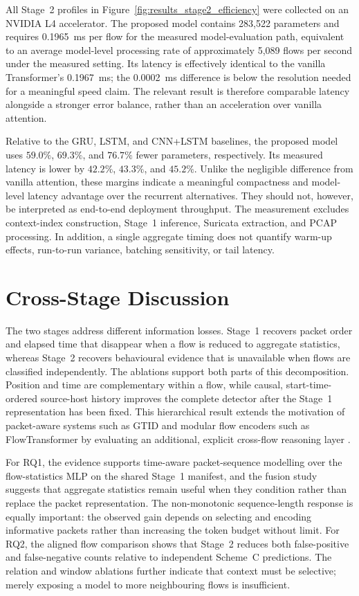 \documentclass[11pt,fleqn]{report}
\begin{document}
All Stage~2 profiles in Figure~\ref{fig:results_stage2_efficiency} were collected on an NVIDIA L4 accelerator. The proposed model contains 283,522 parameters and requires 0.1965~ms per flow for the measured model-evaluation path, equivalent to an average model-level processing rate of approximately 5,089 flows per second under the measured setting. Its latency is effectively identical to the vanilla Transformer's 0.1967~ms; the 0.0002~ms difference is below the resolution needed for a meaningful speed claim. The relevant result is therefore comparable latency alongside a stronger error balance, rather than an acceleration over vanilla attention.

Relative to the GRU, LSTM, and CNN+LSTM baselines, the proposed model uses $59.0\%$, $69.3\%$, and $76.7\%$ fewer parameters, respectively. Its measured latency is lower by $42.2\%$, $43.3\%$, and $45.2\%$. Unlike the negligible difference from vanilla attention, these margins indicate a meaningful compactness and model-level latency advantage over the recurrent alternatives. They should not, however, be interpreted as end-to-end deployment throughput. The measurement excludes context-index construction, Stage~1 inference, Suricata extraction, and PCAP processing. In addition, a single aggregate timing does not quantify warm-up effects, run-to-run variance, batching sensitivity, or tail latency.

\section{Cross-Stage Discussion}
\label{subsec:results_cross_stage_discussion}

The two stages address different information losses. Stage~1 recovers packet order and elapsed time that disappear when a flow is reduced to aggregate statistics, whereas Stage~2 recovers behavioural evidence that is unavailable when flows are classified independently. The ablations support both parts of this decomposition. Position and time are complementary within a flow, while causal, start-time-ordered source-host history improves the complete detector after the Stage~1 representation has been fixed. This hierarchical result extends the motivation of packet-aware systems such as GTID and modular flow encoders such as FlowTransformer by evaluating an additional, explicit cross-flow reasoning layer \cite{Han2023GTID,Manocchio2024FlowTransformer}.

For RQ1, the evidence supports time-aware packet-sequence modelling over the flow-statistics MLP on the shared Stage~1 manifest, and the fusion study suggests that aggregate statistics remain useful when they condition rather than replace the packet representation. The non-monotonic sequence-length response is equally important: the observed gain depends on selecting and encoding informative packets rather than increasing the token budget without limit. For RQ2, the aligned flow comparison shows that Stage~2 reduces both false-positive and false-negative counts relative to independent Scheme~C predictions. The relation and window ablations further indicate that context must be selective; merely exposing a model to more neighbouring flows is insufficient.
\end{document}
